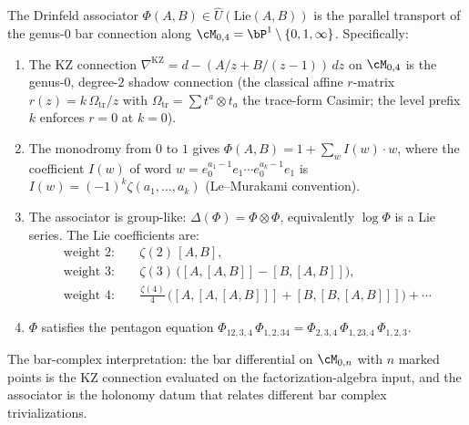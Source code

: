 \begin{theorem}%
\label{thm:drinfeld-associator-bar-transport}%
%
%
%
The Drinfeld associator
$\Phi(A,B) \in \widehat{U}(\mathrm{Lie}(A,B))$
is the parallel transport of the genus-$0$ bar connection
along $\cM_{0,4} = \bP^1 \setminus \{0, 1, \infty\}$.
Specifically:
\begin{enumerate}[label=\textup{(\roman*)}]
\item The KZ connection
$\nabla^{\mathrm{KZ}} = d - (A/z + B/(z{-}1))\,dz$
on $\cM_{0,4}$ is the genus-$0$, degree-$2$ shadow connection
\textup{(}the classical affine $r$-matrix
$r(z) = k\,\Omega_{\mathrm{tr}}/z$ with
$\Omega_{\mathrm{tr}} = \sum t^a \otimes t_a$ the trace-form Casimir; the level
prefix $k$ enforces $r = 0$ at $k = 0$\textup{)}.
\item The monodromy from $0$ to $1$ gives
$\Phi(A,B) = 1 + \sum_w I(w) \cdot w$, where the
coefficient $I(w)$ of word $w = e_0^{a_1-1} e_1 \cdots
e_0^{a_k-1} e_1$ is
$I(w) = (-1)^k \zeta(a_1, \ldots, a_k)$
\textup{(}Le--Murakami convention\textup{)}.
\item The associator is group-like:
$\Delta(\Phi) = \Phi \otimes \Phi$, equivalently
$\log \Phi$ is a Lie series. The Lie coefficients are:
\begin{align*}
\text{weight } 2{:}\quad & \zeta(2)\,[A, B], \\
\text{weight } 3{:}\quad & \zeta(3)\,
\bigl([A, [A, B]] - [B, [A, B]]\bigr), \\
\text{weight } 4{:}\quad &
\tfrac{\zeta(4)}{4}\,\bigl([A,[A,[A,B]]] +
[B,[B,[A,B]]]\bigr) + \cdots
\end{align*}
\item $\Phi$ satisfies the pentagon equation
$\Phi_{12,3,4}\,\Phi_{1,2,34} =
\Phi_{2,3,4}\,\Phi_{1,23,4}\,\Phi_{1,2,3}$.
\end{enumerate}
The bar-complex interpretation:
the bar differential on $\cM_{0,n}$ with $n$ marked
points is the KZ connection evaluated on the
factorization-algebra input, and the associator is
the holonomy datum that relates different bar
complex trivializations.
\end{theorem}


